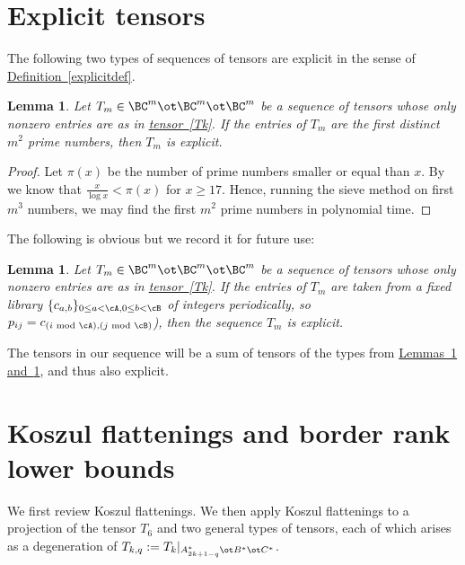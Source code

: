 \documentclass[11pt]{article}
\newcommand{\expref}[2]{\texorpdfstring{\hyperref[#2]{#1~\ref{#2}}}{#1~\ref{#2}}}
\newcommand{\expeqref}[2]{\texorpdfstring{\hyperref[#2]{#1~\eqref{#2}}}{#1~\eqref{#2}}}
\newtheorem{lemma}[theorem]{Lemma}
\begin{document}
\section{Explicit tensors}\label{subs:whatEX}

The following  two types of sequences of tensors are explicit in the sense of 
\expref{Definition}{explicitdef}.

\begin{lemma}\label{expla} Let $T_m\in \BC^m\ot \BC^m\ot \BC^m$ be a sequence of tensors whose only nonzero entries
are as in \expeqref{tensor}{Tk}.   %
If the entries of $T_m$ are the first distinct $m^2$ prime numbers, then $T_m$ is explicit.
\end{lemma}
\begin{proof}
Let $\pi(x)$ be the number of prime numbers smaller or equal than $x$.  By~\cite{rosser1962approximate}
we know that $\frac{x}{\log x}<\pi(x)$ for $x\geq 17$. Hence, running the sieve method on first $m^3$ numbers, 
we may find the  first $m^2$ prime numbers in polynomial time. 
\end{proof}

The following is obvious but we record it for future use:

\begin{lemma}\label{explb}Let $T_m\in \BC^m\ot \BC^m\ot \BC^m$ be a sequence of tensors whose only nonzero entries
are as in \expeqref{tensor}{Tk}.  %
If the entries of $T_m$ 
are taken from a fixed library $\{ c_{a,b}\}_{0\leq a< \cA, 0\leq b< \cB}$ of
integers periodically, so $p_{ij}=c_{(i\text{ mod }\cA),(j\text{ mod }\cB)}$), then the sequence $T_m$ is explicit.
\end{lemma}
  
The tensors in our  sequence will be a sum of tensors of the types from \expref{Lemmas}{expla} \expref{and}{explb}, and thus
also explicit.

\section{Koszul  flattenings and border rank lower bounds}\label{kossect}
We first review Koszul flattenings. 
 We then  apply Koszul flattenings to a projection of the tensor $T_6$ and two general types of tensors, each of which
arises as a degeneration  of $T_{k,q}:=T_k|_{A^*_{2k+1-q}\ot B^*\ot C^*}$.
\end{document}
